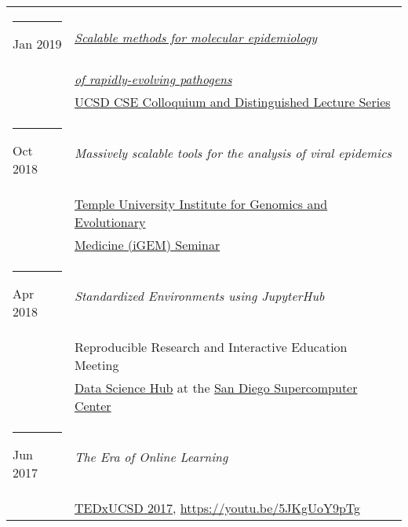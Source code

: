 \documentclass[margin,line]{res}
\begin{document}
\begin{resume}
\begin{longtable}{@{}p{0.7in}p{4in}}
\hspace*{-4mm} \rule{-1mm}{5mm} Jan 2019 & \href{https://cse.ucsd.edu/about/scalable-methods-molecular-epidemiology-rapidly-evolving-pathogens}{\textit{Scalable methods for molecular epidemiology}}\\*
\hspace*{-4mm} & \hspace{4mm} \href{https://cse.ucsd.edu/about/scalable-methods-molecular-epidemiology-rapidly-evolving-pathogens}{\textit{of rapidly-evolving pathogens}}\\*
\hspace*{-4mm} & \hspace{4mm} \href{https://cse.ucsd.edu/about/cse-colloquium-dls/2018-2019}{UCSD CSE Colloquium and Distinguished Lecture Series}\\
\hspace*{-4mm} \rule{-1mm}{5mm} Oct 2018 & \textit{Massively scalable tools for the analysis of viral epidemics}\\*
\hspace*{-4mm} & \hspace{4mm} \href{http://igem.temple.edu/home}{Temple University Institute for Genomics and Evolutionary}\\*
\hspace*{-4mm} & \hspace{4mm} \href{http://igem.temple.edu/home}{Medicine (iGEM) Seminar}\\
\hspace*{-4mm} \rule{-1mm}{5mm} Apr 2018 & \textit{Standardized Environments using JupyterHub}\\*
\hspace*{-4mm} & \hspace{4mm} Reproducible Research and Interactive Education Meeting\\*
\hspace*{-4mm} & \hspace{4mm} \href{https://datascience.sdsc.edu/}{Data Science Hub} at the \href{https://www.sdsc.edu/}{San Diego Supercomputer Center}\\
\hspace*{-4mm} \rule{-1mm}{5mm} Jun 2017 & \textit{The Era of Online Learning}\\*
\hspace*{-4mm} & \hspace{4mm} \href{https://www.ted.com/tedx/events/22004}{TEDxUCSD 2017}, \href{https://youtu.be/5JKgUoY9pTg}{https://youtu.be/5JKgUoY9pTg}\\
\end{longtable}


\end{resume}
\end{document}
